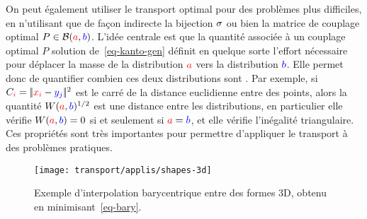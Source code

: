 On peut également utiliser le transport optimal pour des problèmes plus difficiles, en n'utilisant que de façon indirecte la bijection $\sigma$ ou bien la matrice de couplage optimal $P \in \mathcal{B}({\color{red}a},{\color{blue}b})$. L'idée centrale est que la quantité associée à un couplage optimal $P$ solution de~\eqref{eq-kanto-gen}
définit en quelque sorte l'effort nécessaire pour déplacer la masse de la distribution ${\color{red}a}$ vers la distribution ${\color{blue}b}$. Elle permet donc de quantifier combien ces deux distributions sont . Par exemple, si $C_{{\color{red}i}} = |\!| {\color{red}x_i} - {\color{blue}y_j} |\!|^2$ est le carré de la distance euclidienne entre des points, alors la quantité $W({\color{red}a},{\color{blue}b})^{1/2}$ est une distance entre les distributions, en particulier elle vérifie $W({\color{red}a},{\color{blue}b})=0$ si et seulement si ${\color{red}a}={\color{blue}b}$, et elle vérifie l'inégalité triangulaire. Ces propriétés sont très importantes pour permettre d'appliquer le transport à des problèmes pratiques.


\begin{figure}\centering
        \texttt{[image: transport/applis/shapes-3d]}
    \caption{\label{fig:barycenters} Exemple d'interpolation barycentrique entre des formes 3D, obtenu en minimisant~\eqref{eq-bary}.  }
\end{figure}


